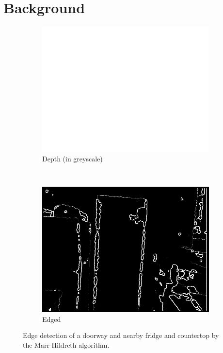 
\section{Background}
\label{sec:background}

\begin{figure}
    \centering
    \begin{subfigure}[t]{0.5\textwidth}
        \centering
        \includegraphics[height=.7\textwidth]{figs/Depth814.png}
        \caption{Depth (in greyscale)}
        \label{fig:814:depth}
    \end{subfigure}%
    ~ 
    \begin{subfigure}[t]{0.5\textwidth}
        \centering
        \includegraphics[height=.7\textwidth]{figs/Edged814.png}
        \caption{Edged}
        \label{fig:814:edged}
    \end{subfigure}
    \caption{Edge detection of a doorway and nearby fridge and countertop by the Marr-Hildreth algorithm.}
\end{figure}


